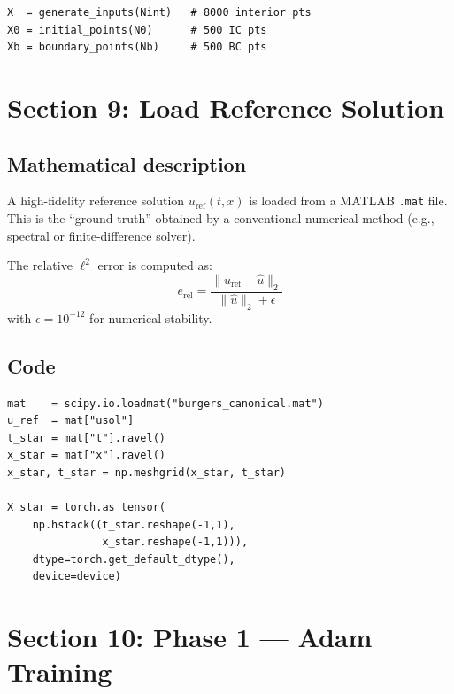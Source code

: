 \documentclass[11pt,a4paper]{article}
\begin{document}
\begin{lstlisting}
X  = generate_inputs(Nint)   # 8000 interior pts
X0 = initial_points(N0)      # 500 IC pts
Xb = boundary_points(Nb)     # 500 BC pts
\end{lstlisting}


\section{Section 9: Load Reference Solution}
\label{sec:reference}

\subsection*{Mathematical description}

A high-fidelity reference solution $u_{\mathrm{ref}}(t,x)$ is loaded from
a MATLAB \texttt{.mat} file.  This is the ``ground truth'' obtained by a
conventional numerical method (e.g., spectral or finite-difference solver).

The relative $\ell^2$ error is computed as:
\begin{equation}
  e_{\mathrm{rel}} = \frac{\|u_{\mathrm{ref}} - \hat{u}\|_2}{\|\hat{u}\|_2 + \epsilon}
\label{eq:rel_error}
\end{equation}
with $\epsilon = 10^{-12}$ for numerical stability.

\subsection*{Code}

\begin{lstlisting}
mat    = scipy.io.loadmat("burgers_canonical.mat")
u_ref  = mat["usol"]
t_star = mat["t"].ravel()
x_star = mat["x"].ravel()
x_star, t_star = np.meshgrid(x_star, t_star)

X_star = torch.as_tensor(
    np.hstack((t_star.reshape(-1,1),
               x_star.reshape(-1,1))),
    dtype=torch.get_default_dtype(),
    device=device)
\end{lstlisting}


\section{Section 10: Phase 1 --- Adam Training}
\label{sec:adam}
\end{document}
